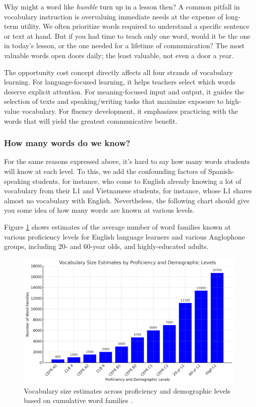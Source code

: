 Why might a word like \textit{humble} turn up in a lesson then? A common pitfall in vocabulary instruction is overvaluing immediate needs at the expense of long-term utility. We often prioritize words required to understand a specific sentence or text at hand. But if you had time to teach only one word, would it be the one in today's lesson, or the one needed for a lifetime of communication? The most valuable words open doors daily; the least valuable, not even a door a year.

The opportunity cost concept directly affects all four strands of vocabulary learning. For language-focused learning, it helps teachers select which words deserve explicit attention. For meaning-focused input and output, it guides the selection of texts and speaking/writing tasks that maximize exposure to high-value vocabulary. For fluency development, it emphasizes practicing with the words that will yield the greatest communicative benefit.

\subsubsection*{How many words do we know?}

For the same reasons expressed above, it's hard to say how many words students will know at each level. To this, we add the confounding factors of Spanish-speaking students, for instance, who come to English already knowing a lot of vocabulary from their L1 and Vietnamese students, for instance, whose L1 shares almost no vocabulary with English. Nevertheless, the following chart should give you some idea of how many words are known at various levels.

Figure \ref{fig:voc-size-est} shows estimates of the average number of word families known at various proficiency levels for English language learners and various Anglophone groups, including 20- and 60-year olds, and highly-educated adults.

\begin{figure}
    \centering
    \includegraphics[width=0.8\linewidth]{figures/vocab-size-est.png}
    \caption{Vocabulary size estimates across proficiency and demographic levels based on cumulative word families \citep{brysbaert2016, capel2010, capel2012}.}
    \label{fig:voc-size-est}
\end{figure}



